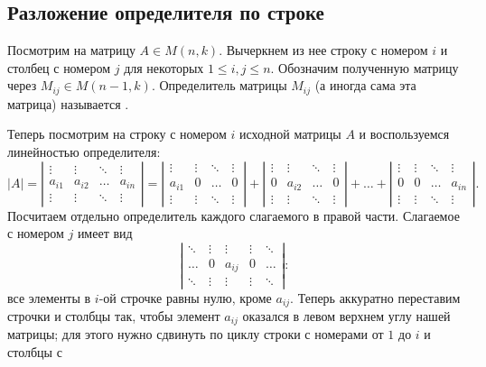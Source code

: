 \subsection{Разложение определителя по строке}

Посмотрим на матрицу $A\in M(n,k)$. Вычеркнем из нее строку с номером
$i$ и столбец с номером $j$ для некоторых $1\leq i,j\leq
n$. Обозначим полученную матрицу через $M_{ij}\in M(n-1,k)$.
Определитель матрицы $M_{ij}$ (а иногда сама эта матрица) называется
.

Теперь посмотрим на строку с номером $i$ исходной матрицы $A$ и
воспользуемся линейностью определителя:
$$
|A| = 
\left|\begin{matrix}\vdots & \vdots & \ddots & \vdots\\
a_{i1} & a_{i2} & \dots & a_{in}\\
\vdots & \vdots & \ddots & \vdots\end{matrix}\right|
= 
\left|\begin{matrix}\vdots & \vdots & \ddots & \vdots\\
a_{i1} & 0 & \dots & 0\\
\vdots & \vdots & \ddots & \vdots\end{matrix}\right| + 
\left|\begin{matrix}\vdots & \vdots & \ddots & \vdots\\
0 & a_{i2} & \dots & 0\\
\vdots & \vdots & \ddots & \vdots\end{matrix}\right| + \dots +
\left|\begin{matrix}\vdots & \vdots & \ddots & \vdots\\
0 & 0 & \dots & a_{in}\\
\vdots & \vdots & \ddots & \vdots\end{matrix}\right|.
$$
Посчитаем отдельно определитель каждого слагаемого в правой части.
Слагаемое с номером $j$ имеет вид
$$
\left|\begin{matrix}\ddots & \vdots & \vdots & \vdots & \ddots\\
\dots & 0 & a_{ij} & 0 & \dots\\
\ddots & \vdots & \vdots & \vdots & \ddots\end{matrix}\right|:
$$
все элементы в $i$-ой строчке равны нулю, кроме $a_{ij}$.
Теперь аккуратно переставим строчки и столбцы так, чтобы элемент
$a_{ij}$ оказался в левом верхнем углу нашей матрицы; для этого
нужно сдвинуть по циклу строки с номерами от $1$ до $i$ и столбцы с
